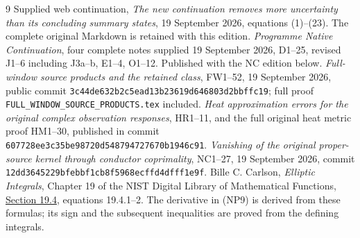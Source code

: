 \documentclass[11pt]{article}
\begin{document}
\begin{thebibliography}{9}
 Supplied web continuation,
\emph{The new continuation removes more uncertainty than its concluding
summary states}, 19 September 2026, equations (1)--(23).
The complete original Markdown is retained with this edition.
 \emph{Programme Native Continuation}, four complete
notes supplied 19 September 2026, D1--25, revised J1--6 including
J3a--b, E1--4, O1--12. Published with the NC edition below.
 \emph{Full-window source products and the retained class},
FW1--52, 19 September 2026, public commit
\texttt{3c44de632b2c5ead13b23619d646803d2bbffc19};
full proof \texttt{FULL\_WINDOW\_SOURCE\_PRODUCTS.tex} included.
 \emph{Heat approximation errors for the original complex
observation responses}, HR1--11, and the full original heat metric
proof HM1--30, published in commit
\texttt{607728ee3c35be98720d548794727670b1946c91}.
 \emph{Vanishing of the original proper-source kernel through
conductor coprimality}, NC1--27, 19 September 2026, commit
\texttt{12dd3645229bfebbf1cb8f5968ecffd4dfff1e9f}.
 Bille C. Carlson, \emph{Elliptic Integrals}, Chapter 19
of the NIST Digital Library of Mathematical Functions,
\href{https://dlmf.nist.gov/19.4}{Section 19.4}, equations 19.4.1--2.
The derivative in (NP9) is derived from these formulas; its sign
and the subsequent inequalities are proved from the defining integrals.
\end{thebibliography}
\end{document}
